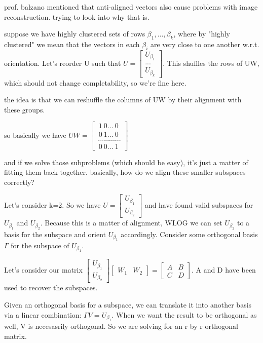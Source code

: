 \documentclass[12pt]{article}
\begin{document}
prof. balzano mentioned that anti-aligned vectors also cause problems with image reconstruction. trying to look into why that is.

suppose we have highly clustered sets of rows $\beta_1,...,\beta_k$, where by "highly clustered" we mean that the vectors in each $\beta_i$ are very close to one another w.r.t. orientation. Let's reorder U such that $U = \begin{bmatrix} U_{\beta_1}\\...\\U_{\beta_k}\end{bmatrix}$. This shuffles the rows of UW, which should not change completability, so we're fine here.

the idea is that we can reshuffle the columns of UW by their alignment with these groups.

so basically we have $UW = \begin{bmatrix} ~1 ~0 ... ~0\\~0 ~1 ... ~0 \\ ... ... ... ... \\ ~0 ~0 ... ~1\end{bmatrix}$

and if we solve those subproblems (which should be easy), it's just a matter of fitting them back together. basically, how do we align these smaller subspaces correctly?

Let's consider k=2. So we have $U = \begin{bmatrix} U_{\beta_1} \\U_{\beta_2}\end{bmatrix}$ and have found valid subspaces for $U_{\beta_1}$ and $U_{\beta_2}$. Because this is a matter of alignment, WLOG we can set $U_{\beta_2}$ to a basis for the subspace and orient $U_{\beta_1}$ accordingly. Consider some orthogonal basis $\Gamma$ for the subspace of $U_{\beta_1}$. 

Let's consider our matrix $\begin{bmatrix} U_{\beta_1} \\U_{\beta_2}\end{bmatrix}\begin{bmatrix}W_1 & W_2\end{bmatrix} = \begin{bmatrix}A & B \\C & D\end{bmatrix}$. A and D have been used to recover the subspaces. 

Given an orthogonal basis for a subspace, we can translate it into another basis via a linear combination: $\Gamma V = U_{\beta_1}$. When we want the result to be orthogonal as well, V is necesasrily orthogonal. So we are solving for an r by r orthogonal matrix. 
\end{document}

